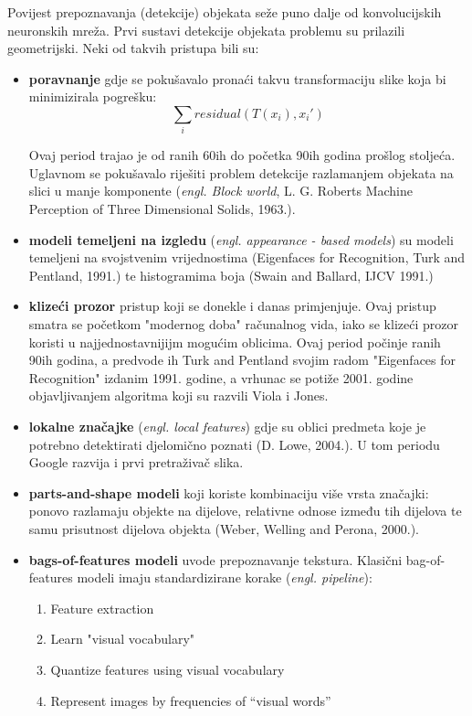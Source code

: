 Povijest prepoznavanja (detekcije) objekata seže puno dalje od konvolucijskih neuronskih mreža. Prvi sustavi detekcije objekata problemu su prilazili geometrijski. Neki od takvih pristupa bili su:

\begin{itemize}
\item \textbf{poravnanje} gdje se pokušavalo pronaći takvu transformaciju slike koja bi minimizirala pogrešku:
\[\sum_{i} residual(T(x_i), x_i')\]

Ovaj period trajao je od ranih 60ih do početka 90ih godina prošlog stoljeća. Uglavnom se pokušavalo riješiti problem detekcije razlamanjem objekata na slici u manje komponente (\textit{engl. Block world}, L. G. Roberts Machine Perception of Three Dimensional Solids, 1963.).
\item \textbf{modeli temeljeni na izgledu} (\textit{engl. appearance - based models}) su modeli temeljeni na svojstvenim vrijednostima (Eigenfaces for Recognition, Turk and Pentland, 1991.) te histogramima boja (Swain and Ballard, IJCV 1991.)
\item \textbf{klizeći prozor} pristup koji se donekle i danas primjenjuje. Ovaj pristup smatra se početkom "modernog doba" računalnog vida, iako se klizeći prozor koristi u najjednostavnijijm mogućim oblicima. Ovaj period počinje ranih 90ih godina, a predvode ih Turk and Pentland svojim radom "Eigenfaces for Recognition" izdanim 1991. godine, a vrhunac se potiže 2001. godine objavljivanjem algoritma koji su razvili Viola i Jones.
\item \textbf{lokalne značajke} (\textit{engl. local features}) gdje su oblici predmeta koje je potrebno detektirati djelomično poznati (D. Lowe, 2004.). U tom periodu Google razvija i prvi pretraživač slika. 
\item \textbf{parts-and-shape modeli} koji koriste kombinaciju više vrsta značajki: ponovo razlamaju objekte na dijelove, relativne odnose između tih dijelova te samu prisutnost dijelova objekta (Weber, Welling and Perona, 2000.).
\item \textbf{bags-of-features modeli} uvode prepoznavanje tekstura. Klasični bag-of-features modeli imaju standardizirane korake (\textit{engl. pipeline}): 
\begin{enumerate}
\item Feature extraction
\item Learn "visual vocabulary"
\item Quantize features using visual vocabulary
\item Represent images by frequencies of “visual words”
\end{enumerate}
\end{itemize}